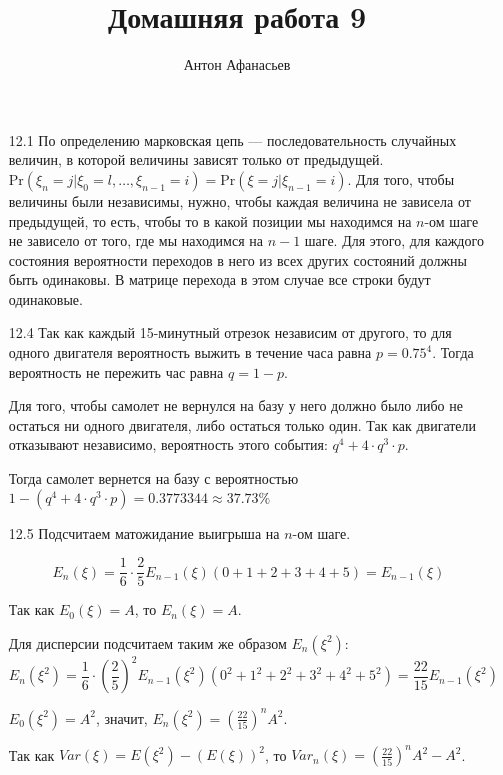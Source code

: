 \documentclass[10pt]{article}
\renewcommand{\P}{\text{Pr}}
\begin{document}
\title{Домашняя работа 9}
\author{Антон Афанасьев}
\maketitle

\begin{enumerate}
\item[12.1] По определению марковская цепь --- последовательность случайных величин, в которой величины зависят только от предыдущей.
$\P(\xi_n = j | \xi_0 = l, \ldots , \xi_{n-1}=i) = \P(\xi = j | \xi_{n-1} = i)$. Для того, чтобы величины были независимы, нужно, чтобы каждая величина не зависела от предыдущей, то есть, чтобы то в какой позиции мы находимся на $n$-ом шаге не зависело от того, где мы находимся на $n-1$ шаге. Для этого, для каждого состояния вероятности переходов в него из всех других состояний должны быть одинаковы. В матрице перехода в этом случае все строки будут одинаковые.

\item[12.4] Так как каждый 15-минутный отрезок независим от другого, то для одного двигателя вероятность выжить в течение часа равна $p = 0.75^4$. Тогда вероятность не пережить час равна $q = 1-p$.

Для того, чтобы самолет не вернулся на базу у него должно было либо не остаться ни одного двигателя, либо остаться только один. Так как двигатели отказывают независимо, вероятность этого события: $q^4 + 4 \cdot q^3 \cdot p$.

Тогда самолет вернется на базу с вероятностью $1 - (q^4 + 4 \cdot q^3 \cdot p) = 0.3773344 \approx 37.73\% $

\item[12.5] Подсчитаем матожидание выигрыша на $n$-ом шаге.

$$E_n (\xi) = \frac{1}{6} \cdot \frac{2}{5} E_{n-1}(\xi) \left ( 0 + 1 + 2 + 3 + 4 + 5 \right ) = E_{n-1}(\xi)$$

Так как $E_0(\xi) = A$, то $E_n(\xi) = A$.

Для дисперсии подсчитаем таким же образом $E_n (\xi^2)$:
$$E_n(\xi^2) = \frac{1}{6} \cdot \left ( \frac{2}{5} \right )^2 E_{n-1}(\xi^2) \left ( 0^2 + 1^2 + 2^2 + 3^2 + 4^2 + 5^2 \right ) = \frac{22}{15} E_{n-1}(\xi^2)$$

$E_0(\xi^2) = A^2$, значит, $E_n(\xi^2) = \left(\frac{22}{15} \right ) ^n A^2$.

Так как $Var(\xi) = E(\xi^2) - (E(\xi))^2$, то $Var_n(\xi) = \left(\frac{22}{15} \right ) ^n A^2 - A^2$.
\end{enumerate}
\end{document}
